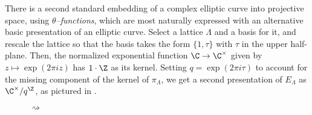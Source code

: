There is a second standard embedding of a complex elliptic curve into projective space, using \textit{$\theta$--functions}, which are most naturally expressed with an alternative basic presentation of an elliptic curve.  Select a lattice $\Lambda$ and a basis for it, and rescale the lattice so that the basis takes the form $\{1, \tau\}$ with $\tau$ in the upper half-plane.  Then, the normalized exponential function $\C \to \C^{\times}$ given by $z \mapsto \exp(2 \pi i z)$ has $1 \cdot \Z$ as its kernel.  Setting $q = \exp(2 \pi i \tau)$ to account for the missing component of the kernel of $\pi_\Lambda$, we get a second presentation of $E_\Lambda$ as $\C^\times / q^{\Z}$, as pictured in .
\begin{figure}
\begin{center}
\quad \quad $\rightsquigarrow$ \quad \quad
{}
\end{center}
\end{figure}
